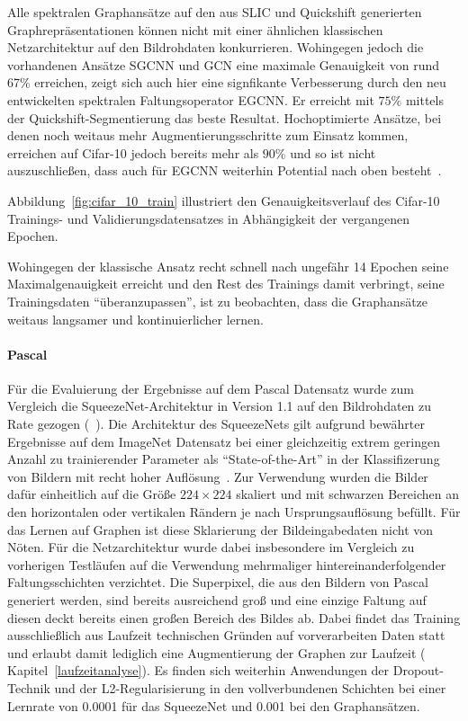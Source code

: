 Alle spektralen Graphansätze auf den aus \gls{SLIC} und Quickshift generierten Graphrepräsentationen können nicht mit einer ähnlichen klassischen Netzarchitektur auf den Bildrohdaten konkurrieren.
Wohingegen jedoch die vorhandenen Ansätze \acs{SGCNN} und \acs{GCN} eine maximale Genauigkeit von rund 67\% erreichen, zeigt sich auch hier eine signfikante Verbesserung durch den neu entwickelten spektralen Faltungsoperator \acs{EGCNN}.
Er erreicht mit $75\%$ mittels der Quickshift-Segmentierung das beste Resultat.
Hochoptimierte Ansätze, bei denen noch weitaus mehr Augmentierungsschritte zum Einsatz kommen, erreichen auf \gls{Cifar}-10 jedoch bereits mehr als $90\%$ und so ist nicht auszuschließen, dass auch für \acs{EGCNN} weiterhin Potential nach oben besteht~\cite{fracmaxpool}.

Abbildung~\ref{fig:cifar_10_train} illustriert den Genauigkeitsverlauf des \gls{Cifar}-10 Trainings- und Validierungsdatensatzes in Abhängigkeit der vergangenen Epochen.

Wohingegen der klassische Ansatz recht schnell nach ungefähr 14 Epochen seine Maximalgenauigkeit erreicht und den Rest des Trainings damit verbringt, seine Trainingsdaten \enquote{überanzupassen}, ist zu beobachten, dass die Graphansätze weitaus langsamer und kontinuierlicher lernen.

\paragraph{\gls{Pascal}}

Für die Evaluierung der Ergebnisse auf dem \gls{Pascal} Datensatz wurde zum Vergleich die SqueezeNet-Architektur in Version 1.1 auf den Bildrohdaten zu Rate gezogen (\vgl{}~\cite{squeeze}).
Die Architektur des SqueezeNets gilt aufgrund bewährter Ergebnisse auf dem ImageNet Datensatz bei einer gleichzeitig extrem geringen Anzahl zu trainierender Parameter als \enquote{State-of-the-Art} in der Klassifizerung von Bildern mit recht hoher Auflösung~\cite{squeeze}.
Zur Verwendung wurden die Bilder dafür einheitlich auf die Größe $224 \times 224$ skaliert und mit schwarzen Bereichen an den horizontalen oder vertikalen Rändern je nach Ursprungsauflösung befüllt.
Für das Lernen auf Graphen ist diese Sklarierung der Bildeingabedaten nicht von Nöten.
Für die Netzarchitektur wurde dabei insbesondere im Vergleich zu vorherigen Testläufen auf die Verwendung mehrmaliger hintereinanderfolgender Faltungsschichten verzichtet.
Die Superpixel, die aus den Bildern von \gls{Pascal} generiert werden, sind bereits ausreichend groß und eine einzige Faltung auf diesen deckt bereits einen großen Bereich des Bildes ab.
Dabei findet das Training ausschließlich aus Laufzeit technischen Gründen auf vorverarbeiten Daten statt und erlaubt damit lediglich eine Augmentierung der Graphen zur Laufzeit (\vgl{} Kapitel~\ref{laufzeitanalyse}).
Es finden sich weiterhin Anwendungen der Dropout-Technik und der L2-Regularisierung in den vollverbundenen Schichten bei einer Lernrate von 0.0001 für das SqueezeNet und 0.001 bei den Graphansätzen.

